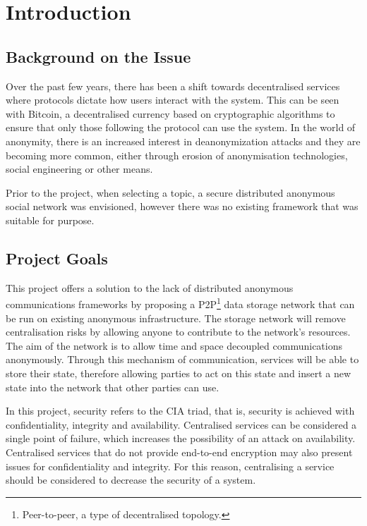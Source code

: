 \section{Introduction}
	\subsection{Background on the Issue}
	Over the past few years, there has been a shift towards decentralised services where protocols dictate how users interact with the system. This can be seen with Bitcoin, a decentralised currency based on cryptographic algorithms to ensure that only those following the protocol can use the system. In the world of anonymity, there is an increased interest in deanonymization attacks and they are becoming more common, either through erosion of anonymisation technologies, social engineering or other means.
	
	Prior to the project, when selecting a topic, a secure distributed anonymous social network was envisioned, however there was no existing framework that was suitable for purpose. 
	
	
	\subsection{Project Goals}
	
	This project offers a solution to the lack of distributed anonymous communications frameworks by proposing a P2P\footnote{Peer-to-peer, a type of decentralised topology.} data storage network that can be run on existing anonymous infrastructure. The storage network will remove centralisation risks by allowing anyone to contribute to the network's resources. The aim of the network is to allow time and space decoupled communications anonymously. Through this mechanism of communication, services will be able to store their state, therefore allowing parties to act on this state and insert a new state into the network that other parties can use.
	
	In this project, security refers to the CIA triad, that is, security is achieved with confidentiality, integrity and availability. Centralised services can be considered a single point of failure, which increases the possibility of an attack on availability. Centralised services that do not provide end-to-end encryption may also present issues for confidentiality and integrity. For this reason, centralising a service should be considered to decrease the security of a system.
	

